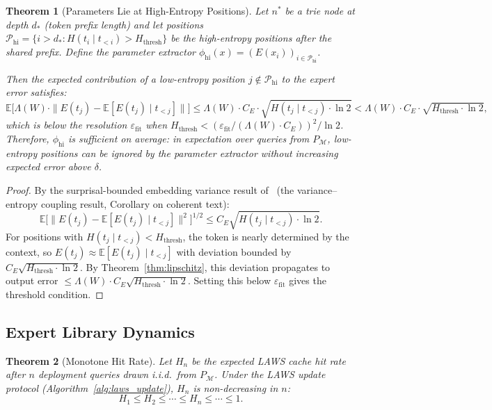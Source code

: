\documentclass[11pt]{article}
\newtheorem{theorem}{Theorem}
\begin{document}
\begin{theorem}[Parameters Lie at High-Entropy Positions]
\label{thm:params}
Let $n^*$ be a trie node at depth $d_*$ (token prefix length) and let positions
$\mathcal{P}_{\mathrm{hi}} = \{i > d_* : H(t_i \mid t_{<i}) > H_{\mathrm{thresh}}\}$
be the high-entropy positions after the shared prefix.  Define the parameter
extractor $\phi_{\mathrm{hi}}(x) = (E(x_i))_{i \in \mathcal{P}_{\mathrm{hi}}}$.

Then the \emph{expected} contribution of a low-entropy position
$j \notin \mathcal{P}_{\mathrm{hi}}$ to the expert error satisfies:
\[
  \mathbb{E}\bigl[\Lambda(W) \cdot \|E(t_j) - \mathbb{E}[E(t_j) \mid t_{<j}]\|\bigr]
  \leq \Lambda(W) \cdot C_E \cdot \sqrt{H(t_j \mid t_{<j}) \cdot \ln 2}
  < \Lambda(W) \cdot C_E \cdot \sqrt{H_{\mathrm{thresh}} \cdot \ln 2},
\]
which is below the resolution $\varepsilon_{\mathrm{fit}}$ when
$H_{\mathrm{thresh}} < (\varepsilon_{\mathrm{fit}} / (\Lambda(W) \cdot C_E))^2 / \ln 2$.
Therefore, $\phi_{\mathrm{hi}}$ is sufficient on average: in expectation over queries
from $P_{\mathcal{M}}$, low-entropy positions can be ignored by the parameter
extractor without increasing expected error above $\delta$.
\end{theorem}

\begin{proof}
By the surprisal-bounded embedding variance result of~\cite{kv2026}
(the variance--entropy coupling result, Corollary on coherent text):
\[
  \mathbb{E}\bigl[\|E(t_j) - \mathbb{E}[E(t_j) \mid t_{<j}]\|^2\bigr]^{1/2}
  \leq C_E \sqrt{H(t_j \mid t_{<j}) \cdot \ln 2}.
\]
For positions with $H(t_j \mid t_{<j}) < H_{\mathrm{thresh}}$, the token is
nearly determined by the context, so $E(t_j) \approx \mathbb{E}[E(t_j) \mid
t_{<j}]$ with deviation bounded by $C_E\sqrt{H_{\mathrm{thresh}} \cdot \ln 2}$.  By
Theorem~\ref{thm:lipschitz}, this deviation propagates to output error
$\leq \Lambda(W) \cdot C_E \sqrt{H_{\mathrm{thresh}} \cdot \ln 2}$.  Setting this below
$\varepsilon_{\mathrm{fit}}$ gives the threshold condition.
\end{proof}

\subsection{Expert Library Dynamics}

\begin{theorem}[Monotone Hit Rate]
\label{thm:monotone}
Let $H_n$ be the expected LAWS cache hit rate after $n$ deployment queries
drawn i.i.d.\ from $P_{\mathcal{M}}$.  Under the LAWS update protocol
(Algorithm~\ref{alg:laws_update}), $H_n$ is non-decreasing in $n$:
\[
  H_1 \leq H_2 \leq \cdots \leq H_n \leq \cdots \leq 1.
\]
\end{theorem}
\end{document}
